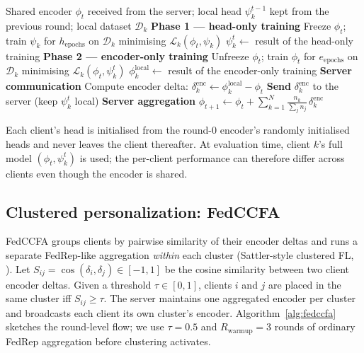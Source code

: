\documentclass[preprint,12pt,authoryear]{elsarticle}
\begin{document}
\begin{algorithm}[!ht]
\caption{FedRep local update for client $k$ at round $t$.}
\label{alg:fedrep}
\begin{algorithmic}[1]
\Require Shared encoder $\phi_t$ received from the server; local head $\psi_k^{t-1}$ kept from the previous round; local dataset $\mathcal{D}_k$
\Statex \textbf{Phase 1 --- head-only training}
\State Freeze $\phi_t$; train $\psi_k$ for $h_{\mathrm{epochs}}$ on $\mathcal{D}_k$ minimising $\mathcal{L}_k(\phi_t, \psi_k)$
\State $\psi_k^t \gets$ result of the head-only training
\Statex \textbf{Phase 2 --- encoder-only training}
\State Unfreeze $\phi_t$; train $\phi_t$ for $e_{\mathrm{epochs}}$ on $\mathcal{D}_k$ minimising $\mathcal{L}_k(\phi_t, \psi_k^t)$
\State $\phi_k^{\mathrm{local}} \gets$ result of the encoder-only training
\Statex \textbf{Server communication}
\State Compute encoder delta: $\delta^{\mathrm{enc}}_k \gets \phi_k^{\mathrm{local}} - \phi_t$
\State \textbf{Send} $\delta^{\mathrm{enc}}_k$ to the server (keep $\psi_k^t$ local)
\Statex \textbf{Server aggregation}
\State $\phi_{t+1} \gets \phi_t + \sum_{k=1}^{N} \frac{n_k}{\sum_{j} n_j}\, \delta^{\mathrm{enc}}_k$
\end{algorithmic}
\end{algorithm}

Each client's head is initialised from the round-0 encoder's
randomly initialised heads and never leaves the client thereafter.
At evaluation time, client $k$'s full model $(\phi_t, \psi_k^t)$ is
used; the per-client performance can therefore differ across clients
even though the encoder is shared.

\subsection{Clustered personalization: FedCCFA}
\label{subsec:fedccfa}

FedCCFA groups clients by pairwise similarity of their encoder
deltas and runs a separate FedRep-like aggregation \emph{within}
each cluster (Sattler-style clustered FL,
\citealp{Sattler2020CFL}). Let $S_{ij} = \cos(\delta_i, \delta_j)
\in [-1, 1]$ be the cosine similarity between two client encoder
deltas. Given a threshold $\tau \in [0, 1]$, clients $i$ and $j$
are placed in the same cluster iff $S_{ij} \geq \tau$. The server
maintains one aggregated encoder per cluster and broadcasts each
client its own cluster's encoder. Algorithm~\ref{alg:fedccfa}
sketches the round-level flow; we use $\tau = 0.5$ and
$R_{\mathrm{warmup}} = 3$ rounds of ordinary FedRep aggregation
before clustering activates.
\end{document}
